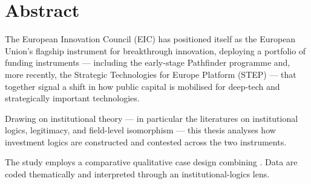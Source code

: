 \chapter*{Abstract}
\thispagestyle{plain}

\noindent
The European Innovation Council (EIC) has positioned itself as the European
Union's flagship instrument for breakthrough innovation, deploying a portfolio
of funding instruments — including the early-stage Pathfinder programme and,
more recently, the Strategic Technologies for Europe Platform (STEP) — that
together signal a shift in how public capital is mobilised for deep-tech and
strategically important technologies.


Drawing on institutional theory — in particular the literatures on
institutional logics, legitimacy, and field-level isomorphism — this thesis
analyses how investment logics are constructed and contested across the two
instruments.

The study employs a comparative qualitative case design combining
. Data are coded thematically and
interpreted through an institutional-logics lens.



